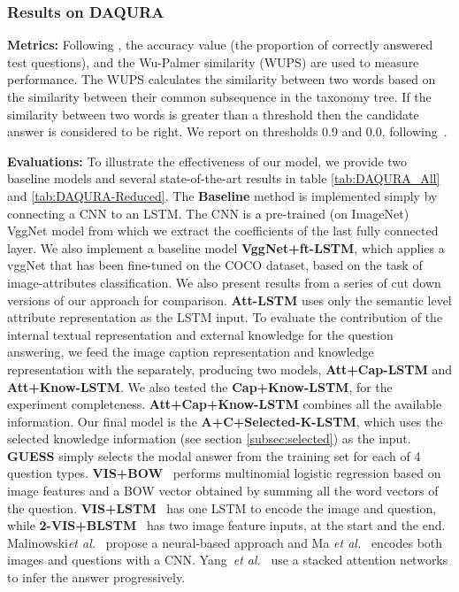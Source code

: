 \documentclass[10pt,journal,compsoc]{IEEEtran}
\newcommand{\etal}{\emph{et al.}}
\begin{document}
\subsubsection{Results on DAQURA}
\textbf{Metrics:}
Following \cite{ma2015learning, ren2015image}, the accuracy value (the proportion of correctly answered test questions), and the Wu-Palmer similarity (WUPS) \cite{wu1994verbs} are used to measure performance. The WUPS calculates the similarity between two words based on the similarity between their common subsequence in the taxonomy tree. If the similarity between two words is greater than a threshold then the candidate answer is considered to be right. We report on thresholds 0.9 and 0.0, following~\cite{ma2015learning,ren2015image}.

\vspace{3pt}
\noindent\textbf{Evaluations:}
To illustrate the effectiveness of our model, we provide two baseline models and several state-of-the-art results in table \ref{tab:DAQURA_All} and \ref{tab:DAQURA-Reduced}. The \textbf{Baseline} method is implemented simply by connecting a CNN to an LSTM. The CNN is a pre-trained (on ImageNet) VggNet model from which we extract the coefficients of the last fully connected layer. We also implement a baseline model \textbf{VggNet+ft-LSTM}, which applies a vggNet that has been fine-tuned on the COCO dataset, based on the task of image-attributes classification. We also present results from a series of cut down versions of our approach for comparison. \textbf{Att-LSTM} uses only the semantic level attribute representation  as the LSTM input. To evaluate the contribution of the internal textual representation and external knowledge for the question answering, we feed the image caption representation  and knowledge representation  with the  separately, producing two models, \textbf{Att+Cap-LSTM} and \textbf{Att+Know-LSTM}. We also tested the \textbf{Cap+Know-LSTM}, for the experiment completeness. \textbf{Att+Cap+Know-LSTM} combines all the available information. Our final model is the \textbf{A+C+Selected-K-LSTM}, which uses the selected knowledge information (see section \ref{subsec:selected}) as the input. \textbf{GUESS} \cite{ren2015image} simply selects the modal answer from the training set for each of 4 question types.  \textbf{VIS+BOW}~\cite{ren2015image} performs multinomial logistic regression based on image features and a BOW vector obtained by summing all the word vectors of the question. \textbf{VIS+LSTM}~\cite{ren2015image} has one LSTM to encode the image and question, while \textbf{2-VIS+BLSTM}~\cite{ren2015image} has two image feature inputs, at the start and the end. Malinowski\etal~\cite{malinowski2015ask} propose a neural-based approach and Ma \textit{et al.}~\cite{ma2015learning} encodes both images and questions with a CNN. Yang~\etal~\cite{yang2015stacked} use a stacked attention networks to infer the answer progressively.
\end{document}
